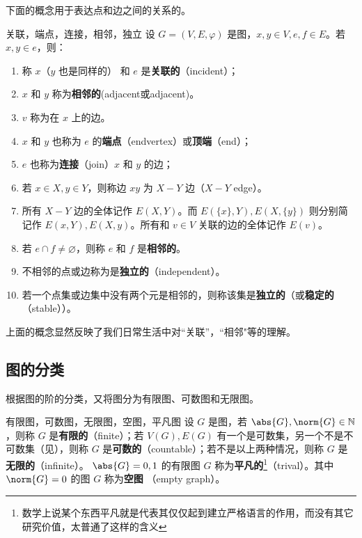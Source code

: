 下面的概念用于表达点和边之间的关系的。
\begin{definition}{关联，端点，连接，相邻，独立}
设 $G=(V,E,\varphi)$ 是图，$x,y\in V,e,f\in E$。若 $x,y\in e$，则：

 \begin{enumerate}
 \item 称 $x$（$y$ 也是同样的） 和 $e$ 是\textbf{关联的}（incident）；

   \item  $x$ 和 $y$ 称为\textbf{相邻的}(adjacent或adjacent)。

   \item $v$ 称为在 $x$ 上的边。
  
   \item $x$ 和 $y$ 也称为 $e$ 的\textbf{端点}（endvertex）或\textbf{顶端}（end）；
  
  \item  $e$ 也称为\textbf{连接}（join）$x$ 和 $y$ 的边；
  
   \item 若 $x\in X,y\in Y$，则称边 $xy$ 为 $X-Y$ 边（$X-Y$ edge）。
  
   \item 所有 $X-Y$ 边的全体记作 $E(X,Y)$。而 $E(\{x\},Y),E(X,\{y\})$ 则分别简记作 $E(x,Y),E(X,y)$。所有和 $v\in V$ 关联的边的全体记作 $E(v)$。

   \item 若 $e\cap f\neq\varnothing$，则称 $e$ 和 $f$ 是\textbf{相邻的}。

   \item 不相邻的点或边称为是\textbf{独立的}（independent）。
   
   \item 若一个点集或边集中没有两个元是相邻的，则称该集是\textbf{独立的}（或\textbf{稳定的}（stable））。
 \end{enumerate}
\end{definition}
上面的概念显然反映了我们日常生活中对“关联”，“相邻"等的理解。

\subsection{图的分类}
根据图的阶的分类，又将图分为有限图、可数图和无限图。
\begin{definition}{有限图，可数图，无限图，空图，平凡图}
设 $G$ 是图，若 $\abs{G},\norm{G}\in\mathbb N$，则称 $G$ 是\textbf{有限的}（finite）；若 $V(G),E(G)$ 有一个是可数集，另一个不是不可数集（见），则称 $G$ 是\textbf{可数的}（countable）；若不是以上两种情况，则称 $G$ 是\textbf{无限的}（infinite）。 $\abs{G}=0,1$ 的有限图 $G$ 称为\textbf{平凡的}\footnote{数学上说某个东西平凡就是代表其仅仅起到建立严格语言的作用，而没有其它研究价值，太普通了这样的含义}（trival）。其中 $\norm{G}=0$ 的图 $G$ 称为\textbf{空图} （empty graph）。 
\end{definition}

